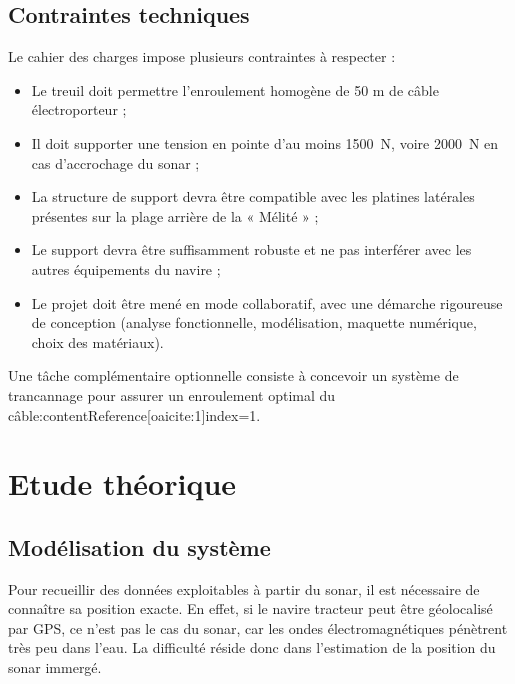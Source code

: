 \documentclass[12pt,a4paper]{report}
\begin{document}
\section{Contraintes techniques}


Le cahier des charges impose plusieurs contraintes à respecter :

\begin{itemize}
  \item Le treuil doit permettre l’enroulement homogène de 50 m de câble électroporteur ;
  \item Il doit supporter une tension en pointe d’au moins 1500~N, voire 2000~N en cas d’accrochage du sonar ;
  \item La structure de support devra être compatible avec les platines latérales présentes sur la plage arrière de la
  « Mélité » ;
  \item Le support devra être suffisamment robuste et ne pas interférer avec les autres équipements du navire ;
  \item Le projet doit être mené en mode collaboratif, avec une démarche rigoureuse de conception
  (analyse fonctionnelle, modélisation, maquette numérique, choix des matériaux).

\end{itemize}


Une tâche complémentaire optionnelle consiste à concevoir un système de trancannage pour assurer un enroulement
optimal du câble:contentReference[oaicite:1]{index=1}.




\chapter{Etude théorique}

\section{Modélisation du système}

Pour recueillir des données exploitables à partir du sonar, il est nécessaire de connaître sa position exacte.
En effet, si le navire tracteur peut être géolocalisé par GPS, ce n’est pas le cas du sonar, car les ondes électromagnétiques pénètrent très peu dans l’eau.
La difficulté réside donc dans l’estimation de la position du sonar immergé.
\end{document}
